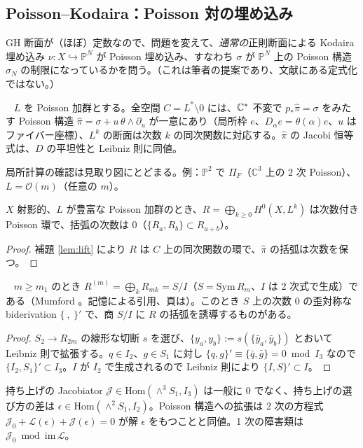 \subsection{Poisson--Kodaira：Poisson 対の埋め込み}
GH 断面が（ほぼ）定数なので、問題を変えて、\emph{通常の}正則断面による Kodaira 埋め込み $\nu:X\hookrightarrow\mathbb P^N$ が Poisson 埋め込み、すなわち $\sigma$ が $\mathbb P^N$ 上の Poisson 構造 $\sigma_N$ の制限になっているかを問う。（これは筆者の提案であり、文献にある定式化ではない。）

\begin{lem}\tP\ \tQ\label{lem:lift}
$L$ を Poisson 加群とする。全空間 $C=L^*\setminus0$ には、$\mathbb C^*$ 不変で $p_*\hat\pi=\sigma$ をみたす Poisson 構造 $\hat\pi=\sigma+u\,\theta\wedge\partial_u$ が一意にあり（局所枠 $e$、$D_\alpha e=\theta(\alpha)e$、$u$ はファイバー座標）、$L^k$ の断面は次数 $k$ の同次関数に対応する。$\hat\pi$ の Jacobi 恒等式は、$D$ の平坦性と Leibniz 則に同値。
\end{lem}
局所計算の確認は見取り図にとどまる\tQ。例：$\mathbb P^2$ で $\Pi_F$（$\mathbb C^3$ 上の 2 次 Poisson）、$L=\mathcal O(m)$（任意の $m$）。
\begin{prop}\tP\label{prop:graded}
$X$ 射影的、$L$ が豊富な Poisson 加群のとき、$R=\bigoplus_{k\ge0}H^0(X,L^k)$ は次数付き Poisson 環で、括弧の次数は 0（$\{R_a,R_b\}\subset R_{a+b}$）。
\end{prop}
\begin{proof}
補題 \ref{lem:lift} により $R$ は $C$ 上の同次関数の環で、$\hat\pi$ の括弧は次数を保つ。\qedhere
\end{proof}
\begin{prop}\tP\ \tC\label{prop:almost}
$m\ge m_1$ のとき $R^{(m)}=\bigoplus_kR_{mk}=S/I$（$S=\mathrm{Sym}\,R_m$、$I$ は 2 次式で生成）である（Mumford \cite{Mum}。記憶による引用、頁は\tQ）。このとき $S$ 上の次数 0 の歪対称な biderivation $\{\ ,\ \}'$ で、商 $S/I$ に $R$ の括弧を誘導するものがある。
\end{prop}
\begin{proof}
$S_2\to R_{2m}$ の線形な切断 $s$ を選び、$\{y_a,y_b\}:=s(\{\bar y_a,\bar y_b\})$ とおいて Leibniz 則で拡張する。$q\in I_2$、$g\in S_1$ に対し $\{q,g\}'\equiv\{\bar q,\bar g\}=0\bmod I_3$ なので $\{I_2,S_1\}'\subset I_3$。$I$ が $I_2$ で生成されるので Leibniz 則により $\{I,S\}'\subset I$。\qedhere
\end{proof}
持ち上げの Jacobiator $\mathcal J\in\mathrm{Hom}(\wedge^3S_1,I_3)$ は一般に 0 でなく、持ち上げの選び方の差は $\epsilon\in\mathrm{Hom}(\wedge^2S_1,I_2)$。Poisson 構造への拡張は 2 次の方程式 $\mathcal J_0+\mathcal L(\epsilon)+\mathcal J(\epsilon)=0$ が解 $\epsilon$ をもつことと同値。1 次の障害類は $\mathcal J_0\bmod\mathrm{im}\,\mathcal L$。

